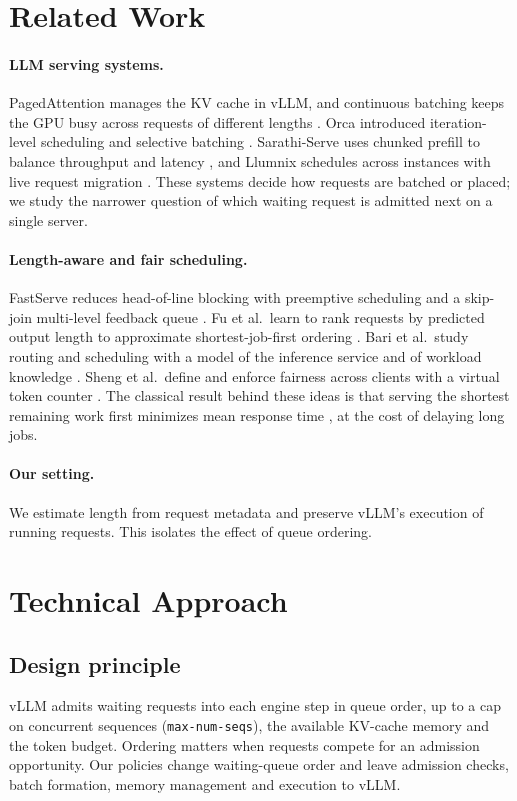 \documentclass[sigplan,nonacm]{acmart}
\begin{document}
\section{Related Work}
\label{sec:related}

\paragraph{LLM serving systems.}
PagedAttention manages the KV cache in vLLM, and continuous batching
keeps the GPU busy across requests of different lengths
\cite{kwon2023efficient}. Orca introduced iteration-level scheduling and
selective batching \cite{yu2022orca}. Sarathi-Serve uses chunked prefill
to balance throughput and latency \cite{agrawal2024sarathi}, and
Llumnix schedules across instances with live request migration
\cite{sun2024llumnix}. These systems decide how requests are batched or
placed; we study the narrower question of which waiting request is
admitted next on a single server.

\paragraph{Length-aware and fair scheduling.}
FastServe reduces head-of-line blocking with preemptive scheduling and
a skip-join multi-level feedback queue \cite{wu2023fastserve}.
Fu et al.\ learn to rank requests by predicted output length to
approximate shortest-job-first ordering \cite{fu2024ltr}. Bari et al.\
study routing and scheduling with a model of the inference service and
of workload knowledge \cite{bari2025optimal}. Sheng et al.\ define and
enforce fairness across clients with a virtual token counter
\cite{sheng2024fairness}. The classical result behind these ideas is
that serving the shortest remaining work first minimizes mean response
time \cite{schrage1968srpt}, at the cost of delaying long jobs.

\paragraph{Our setting.}
We estimate length from request metadata and preserve vLLM's
execution of running requests. This isolates the effect of queue ordering.

\section{Technical Approach}
\label{sec:approach}

\subsection{Design principle}
vLLM admits waiting requests into each engine step in queue order, up to
a cap on concurrent sequences (\texttt{max-num-seqs}), the available
KV-cache memory and the token budget. Ordering matters
when requests compete for an admission opportunity. Our policies
change waiting-queue order and leave admission checks, batch formation,
memory management and execution to vLLM.
\end{document}
